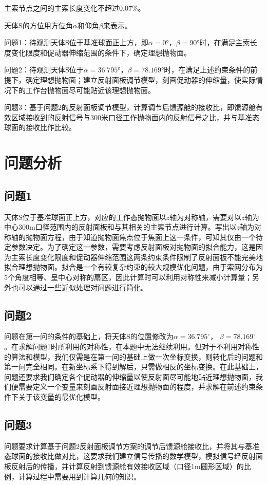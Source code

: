 \documentclass[withoutpreface,bwprint,fontset=macnew]{cumcmthesis} %
\begin{document}
	主索节点之间的主索长度变化不超过$0.07\%$。

	天体S的方位用方位角$\alpha$和仰角$\beta$来表示。

	问题1：待观测天体S位于基准球面正上方，即$\alpha=0°$，$\beta=90°$时，在满足主索长度变化限度和促动器伸缩范围的条件下，确定理想抛物面。

	问题2：待观测天体S位于$\alpha=36.795°$，$\beta=78.169°$时，在满足上述约束条件的前提下，确定理想抛物面；建立反射面板调节模型，刻画促动器的伸缩量，使实际情况下的工作台抛物面尽可能贴近该理想抛物面。

	问题3：基于问题2的反射面板调节模型，计算调节后馈源舱的接收比，即馈源舱有效区域接收到的反射信号与300米口径工作抛物面内的反射信号之比，并与基准态球面的接收比作比较。

	\section{问题分析}
	\subsection{问题1}
	天体S位于基准球面正上方，对应的工作态抛物面以$z$轴为对称轴，需要对以$z$轴为中心300m口径范围内的反射面板和与其相关的主索节点进行计算。写出以$z$轴为对称轴的抛物面方程，由于知道抛物面焦点位于焦面上这一条件，可知其仅由一个待定参数决定。为了确定这一参数，需要考虑反射面板对抛物面的拟合能力，这是因为主索长度变化限度和促动器伸缩范围这两条约束条件限制了反射面板不能完美地拟合理想抛物面。拟合是一个有较复杂约束的较大规模优化问题，由于索网分布为5个角度相等、呈中心对称的扇区，因此计算时可以利用对称性来减小计算量；另外也可以通过一些近似处理对问题进行简化。

	\subsection{问题2}
	问题在第一问的条件的基础上，将天体S的位置修改为$\alpha = 36.795^\circ$， $\beta = 78.169^\circ$。在求解问题1时所利用的对称性，在本题中无法继续利用。但对于不利用对称性的算法和模型，我们仅需是在第一问的基础上做一次坐标变换，则转化后的问题和第一问完全相同。在新坐标系下得到解后，只需做相反的坐标变换。在此基础上，问题还要求我们确定各个促动器的伸缩量以使反射面尽可能地贴近理想抛物面，我们便需要定义一个变量来刻画反射面接近理想抛物面的程度，并求解在前述约束条件下关于该变量的最优化模型。

	\subsection{问题3}
	问题要求计算基于问题2反射面板调节方案的调节后馈源舱接收比，并将其与基准态球面的接收比做对比，这要求我们建立信号传播的数学模型，模拟信号经反射面板反射后的传播，并计算反射到馈源舱有效接收区域（口径1m圆形区域）的比例，计算过程中需要用到计算几何的知识。
\end{document}

